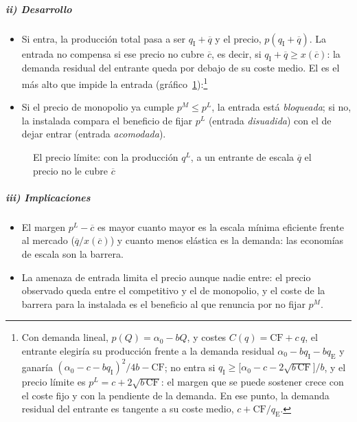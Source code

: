 \documentclass[11pt]{article}
\begin{document}
\subparagraph{ii) Desarrollo}

\begin{itemize}
\item Si entra, la producción total pasa a ser $q_{\mathrm I}+\overline{q}$ y el precio, $p(q_{\mathrm I}+\overline{q})$. La entrada no compensa si ese precio no cubre $\overline{c}$, es decir, si $q_{\mathrm I}+\overline{q}\geq x(\overline{c})$: la demanda residual del entrante queda por debajo de su coste medio. El  es el más alto que impide la entrada (gráfico~\ref{fig:precio-limite}):\footnote{Con demanda lineal, $p(Q)=\alpha_0-bQ$, y costes $C(q)=\mathrm{CF}+c\,q$, el entrante elegiría su producción frente a la demanda residual $\alpha_0-bq_{\mathrm I}-bq_{\mathrm E}$ y ganaría $(\alpha_0-c-bq_{\mathrm I})^{2}/4b-\mathrm{CF}$; no entra si $q_{\mathrm I}\geq\big[\alpha_0-c-2\sqrt{b\,\mathrm{CF}}\big]/b$, y el precio límite es $p^{L}=c+2\sqrt{b\,\mathrm{CF}}$: el margen que se puede sostener crece con el coste fijo y con la pendiente de la demanda. En ese punto, la demanda residual del entrante es tangente a su coste medio, $c+\mathrm{CF}/q_{\mathrm E}$.}
\item Si el precio de monopolio ya cumple $p^{M}\leq p^{L}$, la entrada está \emph{bloqueada}; si no, la instalada compara el beneficio de fijar $p^{L}$ (entrada \emph{disuadida}) con el de dejar entrar (entrada \emph{acomodada}).
\end{itemize}

\begin{figure}[H]
\centering
\caption{El precio límite: con la producción $q^{L}$, a un entrante de escala $\overline{q}$ el precio no le cubre $\overline{c}$}\label{fig:precio-limite}
\end{figure}

\subparagraph{iii) Implicaciones}

\begin{itemize}
\item El margen $p^{L}-\overline{c}$ es mayor cuanto mayor es la escala mínima eficiente frente al mercado ($\overline{q}/x(\overline{c})$) y cuanto menos elástica es la demanda: las economías de escala son la barrera.
\item La amenaza de entrada limita el precio aunque nadie entre: el precio observado queda entre el competitivo y el de monopolio, y el coste de la barrera para la instalada es el beneficio al que renuncia por no fijar $p^{M}$.
\end{itemize}
\end{document}
